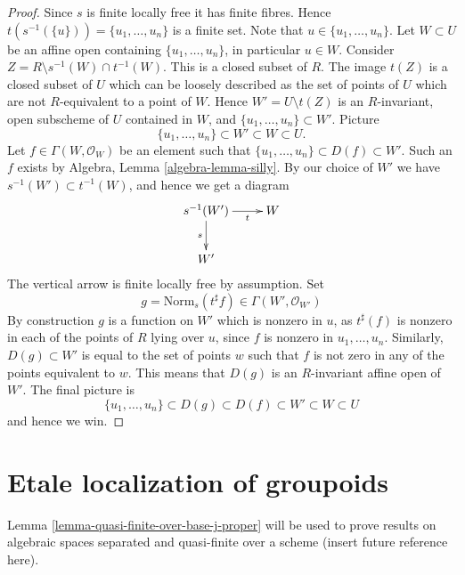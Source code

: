 \begin{proof}
Since $s$ is finite locally free it has finite fibres. Hence
$t(s^{-1}(\{u\})) = \{u_1, \ldots, u_n\}$ is a finite set.
Note that $u \in \{u_1, \ldots, u_n\}$.
Let $W \subset U$ be an affine open containing $\{u_1, \ldots, u_n\}$,
in particular $u \in W$. Consider
$Z = R \setminus s^{-1}(W) \cap t^{-1}(W)$. This is a closed subset
of $R$. The image $t(Z)$ is a closed subset of $U$ which can be loosely
described as the set of points of $U$ which are not $R$-equivalent to a
point of $W$. Hence $W' = U \setminus t(Z)$ is an $R$-invariant, open
subscheme of $U$ contained in $W$, and $\{u_1, \ldots, u_n\} \subset W'$.
Picture
$$
\{u_1, \ldots, u_n\} \subset W' \subset W \subset U.
$$
Let $f \in \Gamma(W, \mathcal{O}_W)$ be an element such that
$\{u_1, \ldots, u_n\} \subset D(f) \subset W'$. Such an $f$ exists by
Algebra, Lemma \ref{algebra-lemma-silly}. By our choice of $W'$ we
have $s^{-1}(W') \subset t^{-1}(W)$, and hence we get a diagram
$$
\xymatrix{
s^{-1}(W') \ar[d]_s \ar[r]_-t & W \\
W'
}
$$
The vertical arrow is finite locally free by assumption. Set
$$
g = \text{Norm}_s(t^\sharp f) \in \Gamma(W', \mathcal{O}_{W'})
$$
By construction $g$ is a function on $W'$ which is
nonzero in $u$, as $t^\sharp(f)$ is nonzero in each of the points of
$R$ lying over $u$, since $f$ is nonzero in $u_1, \ldots, u_n$.
Similarly, $D(g) \subset W'$ is equal to the
set of points $w$ such that $f$ is not zero in any of the points
equivalent to $w$. This means that $D(g)$ is an
$R$-invariant affine open of $W'$. The final picture is
$$
\{u_1, \ldots, u_n\} \subset D(g) \subset D(f) \subset W' \subset W \subset U
$$
and hence we win.
\end{proof}


\section{Etale localization of groupoids}
\label{section-etale-localize}

\noindent
Lemma \ref{lemma-quasi-finite-over-base-j-proper}
will be used to prove results on algebraic spaces
separated and quasi-finite over a scheme (insert future reference here).

